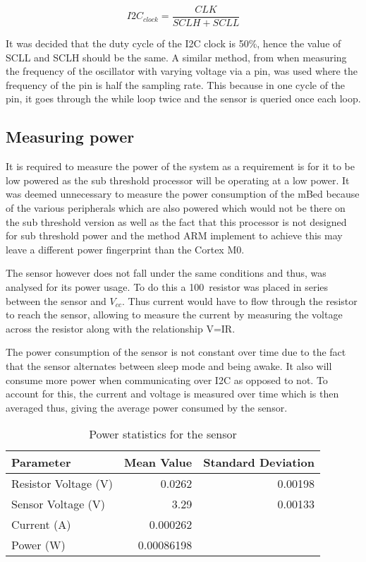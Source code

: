 \begin{equation}
	I2C_{clock} = \frac{CLK}{SCLH + SCLL}
	\label{eqn:i2c_clock}
\end{equation}

It was decided that the duty cycle of the I2C clock is 50\%, hence the value of SCLL and SCLH should be the same. A similar method, from when measuring the frequency of the oscillator with varying voltage via a pin, was used where the frequency of the pin is half the sampling rate. This because in one cycle of the pin, it goes through the while loop twice and the sensor is queried once each loop.

\subsection{Measuring power}

It is required to measure the power of the system as a requirement is for it to be low powered as the sub threshold processor will be operating at a low power. It was deemed unnecessary to measure the power consumption of the mBed because of the various peripherals which are also powered which would not be there on the sub threshold version as well as the fact that this processor is not designed for sub threshold power and the method ARM implement to achieve this may leave a different power fingerprint than the Cortex M0. 

The sensor however does not fall under the same conditions and thus, was analysed for its power usage. To do this a 100\ohm ~resistor was placed in series between the sensor and $V_{cc}$. Thus current would have to flow through the resistor to reach the sensor, allowing to measure the current by measuring the voltage across the resistor along with the relationship V=IR.

The power consumption of the sensor is not constant over time due to the fact that the sensor alternates between sleep mode and being awake. It also will consume more power when communicating over I2C as opposed to not. To account for this, the current and voltage is measured over time which is then averaged thus, giving the average power consumed by the sensor.

\begin{table}
	\centering
	\begin{tabular}{|l|r|r|}
		\hline
		Parameter & Mean Value & Standard Deviation \\
		\hline
		Resistor Voltage (V) & 0.0262 & 0.00198 \\
		Sensor Voltage (V) & 3.29 & 0.00133 \\
		Current (A) & 0.000262 & \\
		Power (W) & 0.00086198 & \\
		\hline
	\end{tabular}
	\caption{Power statistics for the sensor}
	\label{tab:power}
\end{table}

